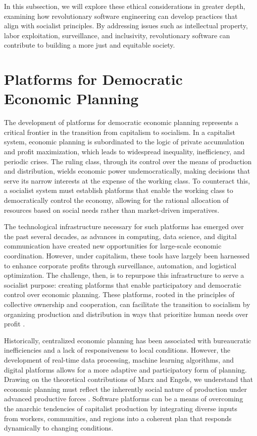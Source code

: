 \begin{refsection}
In this subsection, we will explore these ethical considerations in greater depth, examining how revolutionary software engineering can develop practices that align with socialist principles. By addressing issues such as intellectual property, labor exploitation, surveillance, and inclusivity, revolutionary software can contribute to building a more just and equitable society.

\section{Platforms for Democratic Economic Planning}

The development of platforms for democratic economic planning represents a critical frontier in the transition from capitalism to socialism. In a capitalist system, economic planning is subordinated to the logic of private accumulation and profit maximization, which leads to widespread inequality, inefficiency, and periodic crises. The ruling class, through its control over the means of production and distribution, wields economic power undemocratically, making decisions that serve its narrow interests at the expense of the working class. To counteract this, a socialist system must establish platforms that enable the working class to democratically control the economy, allowing for the rational allocation of resources based on social needs rather than market-driven imperatives.

The technological infrastructure necessary for such platforms has emerged over the past several decades, as advances in computing, data science, and digital communication have created new opportunities for large-scale economic coordination. However, under capitalism, these tools have largely been harnessed to enhance corporate profits through surveillance, automation, and logistical optimization. The challenge, then, is to repurpose this infrastructure to serve a socialist purpose: creating platforms that enable participatory and democratic control over economic planning. These platforms, rooted in the principles of collective ownership and cooperation, can facilitate the transition to socialism by organizing production and distribution in ways that prioritize human needs over profit \cite[pp.~217]{cockshott1993towards}.

Historically, centralized economic planning has been associated with bureaucratic inefficiencies and a lack of responsiveness to local conditions. However, the development of real-time data processing, machine learning algorithms, and digital platforms allows for a more adaptive and participatory form of planning. Drawing on the theoretical contributions of Marx and Engels, we understand that economic planning must reflect the inherently social nature of production under advanced productive forces \cite[pp.~707]{marx1973grundrisse}. Software platforms can be a means of overcoming the anarchic tendencies of capitalist production by integrating diverse inputs from workers, communities, and regions into a coherent plan that responds dynamically to changing conditions.


\end{refsection}
